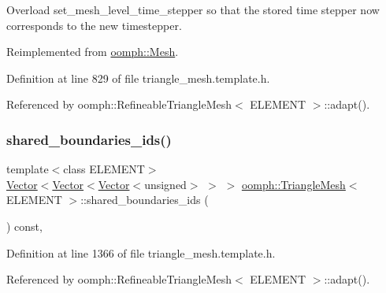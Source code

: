 Overload set\+\_\+mesh\+\_\+level\+\_\+time\+\_\+stepper so that the stored time stepper now corresponds to the new timestepper. 



Reimplemented from \hyperlink{classoomph_1_1Mesh_a52c30b4ebc67038e137a5de1c5d422e5}{oomph\+::\+Mesh}.



Definition at line 829 of file triangle\+\_\+mesh.\+template.\+h.



Referenced by oomph\+::\+Refineable\+Triangle\+Mesh$<$ E\+L\+E\+M\+E\+N\+T $>$\+::adapt().

\mbox{\label{classoomph_1_1TriangleMesh_a89a3d87293ecec5b4b455377ccd4c9a4}} 
\subsubsection{\texorpdfstring{shared\+\_\+boundaries\+\_\+ids()}{shared\_boundaries\_ids()}\hspace{0.1cm}{\footnotesize\ttfamily [1/7]}}
{\footnotesize\ttfamily template$<$class E\+L\+E\+M\+E\+NT$>$ \\
\hyperlink{classoomph_1_1Vector}{Vector}$<$\hyperlink{classoomph_1_1Vector}{Vector}$<$\hyperlink{classoomph_1_1Vector}{Vector}$<$unsigned$>$ $>$ $>$ \hyperlink{classoomph_1_1TriangleMesh}{oomph\+::\+Triangle\+Mesh}$<$ E\+L\+E\+M\+E\+NT $>$\+::shared\+\_\+boundaries\+\_\+ids (\begin{DoxyParamCaption}{ }\end{DoxyParamCaption}) const\hspace{0.3cm}{\ttfamily [inline]}, {\ttfamily [protected]}}



Definition at line 1366 of file triangle\+\_\+mesh.\+template.\+h.



Referenced by oomph\+::\+Refineable\+Triangle\+Mesh$<$ E\+L\+E\+M\+E\+N\+T $>$\+::adapt().

\mbox{\label{classoomph_1_1TriangleMesh_abdbc5649848391bfb94ebe6ff2ded1bc}} 
